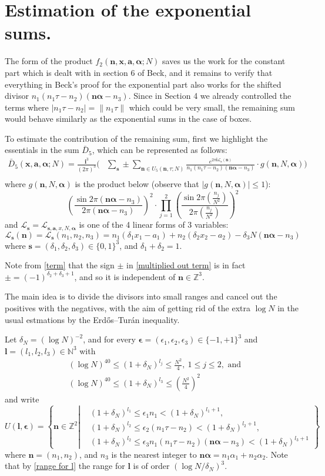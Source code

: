 \documentclass[11pt]{article}
\newcommand{\beq}{\begin{equation}}
\newcommand{\eeq}{\end{equation}}
\newcommand{\fc}{\frac}
\renewcommand{\l}{\left}
\renewcommand{\r}{\right}
\newcommand{\Z}{\mathbb{Z}}
\newcommand{\N}{\mathbb{N}}
\renewcommand{\a}{\alpha}
\newcommand{\e}{\epsilon}
\renewcommand{\i}{\mathbf{i}}
\renewcommand{\(}{\left(}
\renewcommand{\)}{\right)}
\renewcommand{\bf}{\mathbf}
\renewcommand{\d}{\delta}
\newcommand{\bal}{\begin{aligned}}
\newcommand{\eal}{\end{aligned}}
\renewcommand{\L}{\mathcal{L}}
\newcommand{\n}{\bf{n}}
\newcommand{\bma}{\bm{\alpha}}
\newcommand{\ftwo}{f_2(\bf{n},\bf{x},\bm{a},\bm{\a};N)}
\newcommand{\<}{\langle}
\renewcommand{\>}{\rangle}
\begin{document}
\section{Estimation of the exponential sums.}
The form of the product $\ftwo$ saves us the work for the constant part which is dealt with in section 6 of Beck\cite{Beck}, and it remains to verify that everything in Beck's proof for the exponential part also works for the shifted divisor $n_1(n_1\tau-n_2)(\n\bma-n_3)$. Since in Section 4 we already controlled the terms where $|n_1\tau-n_2|=\|n_1\tau\|$ which could be very small, the remaining sum would behave similarly as the exponential sums in the case of boxes.

To estimate the contribution of the remaining sum, first we highlight the essentials in the sum $\bar{D}_5$, which can be represented as follows:
\beq\label{multiplied out term}
\bal
\bar{D}_5(\bf{x},\bm{a},\bm{\a};N)=\fc{\i^3}{(2\pi)^3}
\Bigg(
&\sum_{\bf{s}}\pm\sum_{\bf{n}\in U_5(\n,\tau; N)} \fc{e^{2\pi \i \bf{\L_s}(\bf{n})}}{n_1(n_1\tau-n_2)(\n\bma-n_3)}\cdot g(\n, N, \bma)\Bigg)\\
\eal
\eeq
where $g(\bf{n}, N, \bma)$ is the product below (observe that $|g(\bf{n},N,\bma)|\le 1$):
\beq\label{gN}
\l(\fc{\sin 2\pi (\n\bma-n_3)}{2\pi (\n\bma-n_3)}\r)^2\cdot\prod_{j=1}^{2}\l(\fc{\sin 2\pi(\fc{n_j}{N^2})}{2\pi(\fc{n_j}{N^2})}\r)^2
\eeq
and $\L_\bf{s}=\L_{\bf{s},\bm{a}, x,N, \bma}$ is one of the 4 linear forms of $3$ variables:
\beq\label{linear forms}
\L_\bf{s}(\bf{n})=\L_\bf{s}(n_1,n_2,n_3)=n_1(\d_1x_1-a_1)+n_2(\d_2x_2-a_2) - \d_3N(\n\bma-n_3) 
\eeq
where $\bf{s}=(\d_1,\d_2,\d_3)\in \{0,1\}^3$, and $\d_1+\d_2=1$.

Note from \eqref{term} that the sign $\pm$ in \eqref{multiplied out term} is in fact $\pm=(-1)^{\d_2+\d_3+1}$, and so it is independent of $\bf{n}\in \Z^3$.

The main idea is to divide the divisors into small ranges and cancel out the positives with the negatives, with the aim of getting rid of the extra $\log N$ in the usual estmations by the Erdős–Turán inequality.  

Let $\d_N=(\log N)^{-2}$, and for every $\bf{\e}=(\e_1,\e_2,\e_3)\in \{-1,+1\}^3$ and $\bf{l}=(l_1,l_2,l_3)\in \N^3$ with 
\beq\label{range for l}
\bal
&(\log N)^{40}\le (1+\d_N)^{l_j}\le \fc{N^2}{4}, \ 1\le j\le 2, \text{ and }\\
&(\log N)^{40} \le (1+\d_N)^{l_3}\le \l(\fc{N^2}{4}\r)^2
\eal
\eeq
and write 
\beq\label{Def for Ul}
U(\bf{l},\bf{\e})=
\l\{
\n\in \Z^2 \l|
\bal 
& (1+\d_N)^{l_1}\le \e_1n_1<(1+\d_N)^{l_1+1},\\
& (1+\d_N)^{l_2}\le \e_2(n_1\tau-n_2)< (1+\d_N)^{l_2+1},\\
& (1+\d_N)^{l_2} \le \e_3n_1 (n_1\tau-n_2)(\n\bma-n_3)<(1+\d_N)^{l_3+1}
\eal
\r.\r\}
\eeq
where $\n=(n_1,n_2)$, and $n_3$ is the nearest integer to $\n\bma=n_1\a_1+n_2\a_2$. Note that by \eqref{range for l} the range for $\bf{l}$ is of order $(\log N/\d_N)^{3}$.
\end{document}
